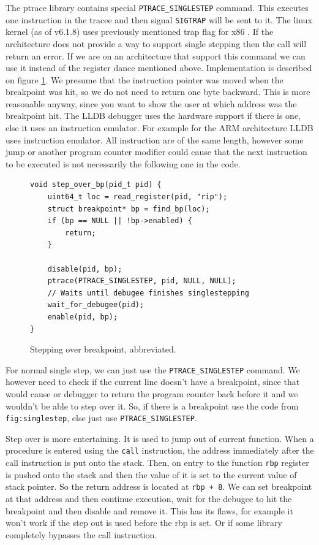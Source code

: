 The ptrace library contains special \texttt{PTRACE\_SINGLESTEP} command. This
executes one instruction in the tracee and then signal \texttt{SIGTRAP} will be
sent to it. The linux kernel (as of v6.1.8) uses previously mentioned trap flag
for x86 \cite{linuxkernel-trapflag}. If the architecture does not provide a way
to support single stepping then the call will return an error. If we are on an
architecture that support this command we can use it instead of the register
dance mentioned above. Implementation is described on figure
\ref{fig:singlestep}. We presume that the instruction pointer was moved when
the breakpoint was hit, so we do not need to return one byte backward. This is
more reasonable anyway, since you want to show the user at which address was
the breakpoint hit. The LLDB \cite{lldb} debugger uses the hardware support if
there is one, else it uses an instruction emulator. For example for the ARM
architecture LLDB uses instruction emulator. All instruction are of the same
length, however some jump or another program counter modifier could cause that
the next instruction to be executed is not necessarily the following one in the
code.

\begin{figure}\label{fig:singlestep}
    \begin{verbatim}
void step_over_bp(pid_t pid) {
    uint64_t loc = read_register(pid, "rip");
    struct breakpoint* bp = find_bp(loc);
    if (bp == NULL || !bp->enabled) {
        return;
    }

    disable(pid, bp);
    ptrace(PTRACE_SINGLESTEP, pid, NULL, NULL);
    // Waits until debugee finishes singlestepping
    wait_for_debugee(pid);
    enable(pid, bp);
}
    \end{verbatim}
    \caption{Stepping over breakpoint, abbreviated.}
\end{figure}

For normal single step, we can just use the \texttt{PTRACE\_SINGLESTEP} command.
We however need to check if the current line doesn't have a breakpoint, since
that would cause or debugger to return the program counter back before it and
we wouldn't be able to step over it. So, if there is a breakpoint use the code
from \texttt{fig:singlestep}, else just use \texttt{PTRACE\_SINGLESTEP}.

Step over is more entertaining. It is used to jump out of current function.
When a procedure is entered using the \texttt{call} instruction, the address
immediately after the call instruction is put onto the stack. Then, on entry to
the function \texttt{rbp} register is pushed onto the stack and then the value
of it is set to the current value of stack pointer. So the return address is
located at \texttt{rbp + 8}. We can set breakpoint at that address and then
continue execution, wait for the debugee to hit the breakpoint and then disable
and remove it. This has its flaws, for example it won't work if the step out is
used before the rbp is set. Or if some library completely bypasses the call
instruction.


